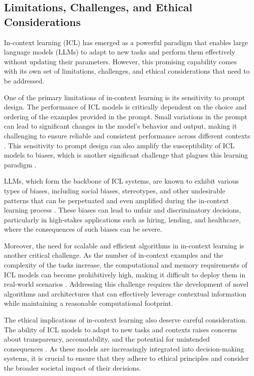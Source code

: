 \documentclass[11pt]{article}
\begin{document}
\subsection{Limitations, Challenges, and Ethical Considerations}

In-context learning (ICL) has emerged as a powerful paradigm that enables large language models (LLMs) to adapt to new tasks and perform them effectively without updating their parameters. However, this promising capability comes with its own set of limitations, challenges, and ethical considerations that need to be addressed.

One of the primary limitations of in-context learning is its sensitivity to prompt design. The performance of ICL models is critically dependent on the choice and ordering of the examples provided in the prompt. Small variations in the prompt can lead to significant changes in the model's behavior and output, making it challenging to ensure reliable and consistent performance across different contexts \cite{ref51}. This sensitivity to prompt design can also amplify the susceptibility of ICL models to biases, which is another significant challenge that plagues this learning paradigm \cite{ref52,ref53}.

LLMs, which form the backbone of ICL systems, are known to exhibit various types of biases, including social biases, stereotypes, and other undesirable patterns that can be perpetuated and even amplified during the in-context learning process \cite{ref53,ref54}. These biases can lead to unfair and discriminatory decisions, particularly in high-stakes applications such as hiring, lending, and healthcare, where the consequences of such biases can be severe.

Moreover, the need for scalable and efficient algorithms in in-context learning is another critical challenge. As the number of in-context examples and the complexity of the tasks increase, the computational and memory requirements of ICL models can become prohibitively high, making it difficult to deploy them in real-world scenarios \cite{ref55}. Addressing this challenge requires the development of novel algorithms and architectures that can effectively leverage contextual information while maintaining a reasonable computational footprint.

The ethical implications of in-context learning also deserve careful consideration. The ability of ICL models to adapt to new tasks and contexts raises concerns about transparency, accountability, and the potential for unintended consequences \cite{ref56,ref57}. As these models are increasingly integrated into decision-making systems, it is crucial to ensure that they adhere to ethical principles and consider the broader societal impact of their decisions.
\end{document}
